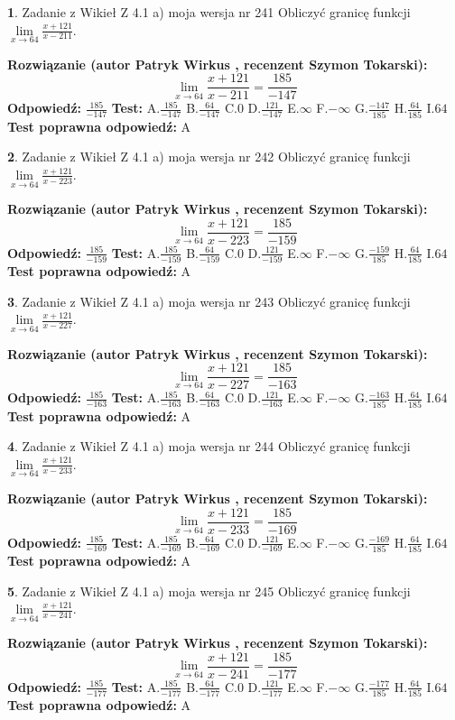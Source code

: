 \documentclass[12pt, a4paper]{article}
\theoremstyle{definition} %
\newtheorem{zad}{}
\newcommand{\zadStart}[1]{\begin{zad}#1\newline}
\newcommand{\zadStop}{\end{zad}}
\newcommand{\rozwStart}[2]{\noindent \textbf{Rozwiązanie (autor #1 , recenzent #2): }\newline}
\newcommand{\rozwStop}{\newline}
\newcommand{\odpStart}{\noindent \textbf{Odpowiedź:}\newline}
\newcommand{\odpStop}{\newline}
\newcommand{\testStart}{\noindent \textbf{Test:}\newline}
\newcommand{\testStop}{\newline}
\newcommand{\kluczStart}{\noindent \textbf{Test poprawna odpowiedź:}\newline}
\newcommand{\kluczStop}{\newline}
\begin{document}
\zadStart{Zadanie z Wikieł Z 4.1 a) moja wersja nr 241}
Obliczyć granicę funkcji $\lim\limits_{x\to64}\frac{x+121}{x-211}$.
\zadStop
\rozwStart{Patryk Wirkus}{Szymon Tokarski}
$$\lim\limits_{x\to64}\frac{x+121}{x-211} = \frac{185}{-147}$$
\rozwStop
\odpStart
$\frac{185}{-147}$
\odpStop
\testStart
A.$\frac{185}{-147}$
B.$\frac{64}{-147}$
C.$0$
D.$\frac{121}{-147}$
E.$\infty$
F.$-\infty$
G.$\frac{-147}{185}$
H.$\frac{64}{185}$
I.$64$
\testStop
\kluczStart
A
\kluczStop



\zadStart{Zadanie z Wikieł Z 4.1 a) moja wersja nr 242}
Obliczyć granicę funkcji $\lim\limits_{x\to64}\frac{x+121}{x-223}$.
\zadStop
\rozwStart{Patryk Wirkus}{Szymon Tokarski}
$$\lim\limits_{x\to64}\frac{x+121}{x-223} = \frac{185}{-159}$$
\rozwStop
\odpStart
$\frac{185}{-159}$
\odpStop
\testStart
A.$\frac{185}{-159}$
B.$\frac{64}{-159}$
C.$0$
D.$\frac{121}{-159}$
E.$\infty$
F.$-\infty$
G.$\frac{-159}{185}$
H.$\frac{64}{185}$
I.$64$
\testStop
\kluczStart
A
\kluczStop



\zadStart{Zadanie z Wikieł Z 4.1 a) moja wersja nr 243}
Obliczyć granicę funkcji $\lim\limits_{x\to64}\frac{x+121}{x-227}$.
\zadStop
\rozwStart{Patryk Wirkus}{Szymon Tokarski}
$$\lim\limits_{x\to64}\frac{x+121}{x-227} = \frac{185}{-163}$$
\rozwStop
\odpStart
$\frac{185}{-163}$
\odpStop
\testStart
A.$\frac{185}{-163}$
B.$\frac{64}{-163}$
C.$0$
D.$\frac{121}{-163}$
E.$\infty$
F.$-\infty$
G.$\frac{-163}{185}$
H.$\frac{64}{185}$
I.$64$
\testStop
\kluczStart
A
\kluczStop



\zadStart{Zadanie z Wikieł Z 4.1 a) moja wersja nr 244}
Obliczyć granicę funkcji $\lim\limits_{x\to64}\frac{x+121}{x-233}$.
\zadStop
\rozwStart{Patryk Wirkus}{Szymon Tokarski}
$$\lim\limits_{x\to64}\frac{x+121}{x-233} = \frac{185}{-169}$$
\rozwStop
\odpStart
$\frac{185}{-169}$
\odpStop
\testStart
A.$\frac{185}{-169}$
B.$\frac{64}{-169}$
C.$0$
D.$\frac{121}{-169}$
E.$\infty$
F.$-\infty$
G.$\frac{-169}{185}$
H.$\frac{64}{185}$
I.$64$
\testStop
\kluczStart
A
\kluczStop



\zadStart{Zadanie z Wikieł Z 4.1 a) moja wersja nr 245}
Obliczyć granicę funkcji $\lim\limits_{x\to64}\frac{x+121}{x-241}$.
\zadStop
\rozwStart{Patryk Wirkus}{Szymon Tokarski}
$$\lim\limits_{x\to64}\frac{x+121}{x-241} = \frac{185}{-177}$$
\rozwStop
\odpStart
$\frac{185}{-177}$
\odpStop
\testStart
A.$\frac{185}{-177}$
B.$\frac{64}{-177}$
C.$0$
D.$\frac{121}{-177}$
E.$\infty$
F.$-\infty$
G.$\frac{-177}{185}$
H.$\frac{64}{185}$
I.$64$
\testStop
\kluczStart
A
\kluczStop
\end{document}
